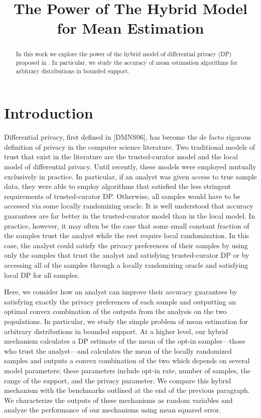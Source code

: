 \documentclass{article}
\title{The Power of The Hybrid Model for Mean Estimation}
\theoremstyle{plain}
\begin{document}
\maketitle

\begin{abstract}
In this work we explore the power of the hybrid model of differential privacy (DP) proposed in \cite{blender}. In particular, we study the accuracy of mean estimation algorithms for arbitrary distributions in bounded support.
\end{abstract}

\section{Introduction}

Differential privacy, first defined in [DMNS06], has become the de facto rigorous definition of privacy in the computer science literature. Two traditional models of trust that exist in the literature are the trusted-curator model and the local model of differential privacy. Until recently, these models were employed mutually exclusively in practice. In particular, if an analyst was given access to true sample data, they were able to employ algorithms that satisfied the less stringent requirements of trusted-curator DP. Otherwise, all samples would have to be accessed via some locally randomizing oracle. It is well understood that accuracy guarantees are far better in the trusted-curator model than in the local model. In practice, however, it may often be the case that some small constant fraction of the samples trust the analyst while the rest require local randomization. In this case, the analyst could satisfy the privacy preferences of their samples by using only the samples that trust the analyst and satisfying trusted-curator DP or by accessing all of the samples through a locally randomizing oracle and satisfying local DP for all samples. 

Here, we consider how an analyst can improve their accuracy guarantees by satisfying exactly the privacy preferences of each sample and outputting an optimal convex combination of the outputs from the analysis on the two populations. In particular, we study the simple problem of mean estimation for arbitrary distributions in bounded support. At a higher level, our hybrid mechanism calculates a DP estimate of the mean of the opt-in samples—those who trust the analyst—and calculates the mean of the locally randomized samples and outputs a convex combination of the two which depends on several model parameters; these parameters include opt-in rate, number of samples, the range of the support, and the privacy parameter. We compare this hybrid mechanism with the benchmarks outlined at the end of the previous paragraph. We characterize the outputs of these mechanisms as random variables and analyze the performance of our mechanisms using mean squared error. 
\end{document}
